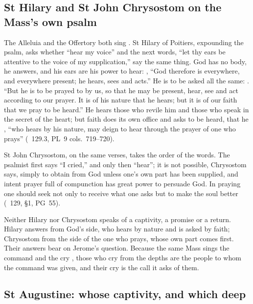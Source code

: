 \subsection{St Hilary and St John Chrysostom on the Mass's own psalm}
\label{sec:captivity-psalm}

The Alleluia and the Offertory both sing . St Hilary of Poitiers, expounding the
psalm, asks whether ``hear my voice'' and the next words, ``let thy ears be
attentive to the voice of my supplication,'' say the same thing. God has no
body, he answers, and his ears are his power to hear: , ``God therefore is everywhere,
and everywhere present; he hears, sees and acts.'' He is to be asked all the
same: . ``But he is to be prayed to by us, so that he may be
present, hear, see and act according to our prayer. It is of his nature that
he hears; but it is of our faith that we pray to be heard.'' He hears those
who revile him and those who speak in the secret of the heart; but faith does
its own office and asks to be heard, that he , ``who hears by his nature, may
deign to hear through the prayer of one who prays'' (\
129.3, PL~9 cols.~719--720).

St John Chrysostom, on the same verses, takes the order of the words. The
psalmist first says ``I cried,'' and only then ``hear''; it is not possible,
Chrysostom says, simply to obtain from God unless one's own part has been
supplied, and intent prayer full of compunction has great power to persuade
God. In praying one should seek not only to receive what one asks but to make
the soul better (\work{Expositio in Ps.}\ 129, §1, PG~55).

Neither Hilary nor Chrysostom speaks of a captivity, a promise or a return.
Hilary answers from God's side, who hears by nature and is asked by faith;
Chrysostom from the side of the one who prays, whose own part comes first.
Their answers bear on Jerome's question. Because the same Mass sings the
command \latin{invocábitis me} and the cry \latin{De profúndis}, those who cry
from the depths are the people to whom the command was given, and their cry
is the call it asks of them.

\subsection{St Augustine: whose captivity, and which deep}
\label{sec:captivity-augustine}

